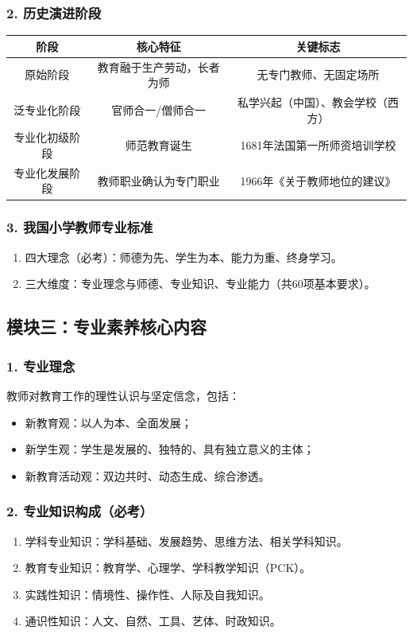 \documentclass[12pt,a4paper]{article}
\begin{document}
\subsubsection{2. 历史演进阶段}
\begin{longtable}{|c|c|c|}
\hline
\textbf{阶段} & \textbf{核心特征} & \textbf{关键标志} \\
\hline
原始阶段 & 教育融于生产劳动，长者为师 & 无专门教师、无固定场所 \\
\hline
泛专业化阶段 & 官师合一/僧师合一 & 私学兴起（中国）、教会学校（西方） \\
\hline
专业化初级阶段 & 师范教育诞生 & 1681年法国第一所师资培训学校 \\
\hline
专业化发展阶段 & 教师职业确认为专门职业 & 1966年《关于教师地位的建议》 \\
\hline
\end{longtable}

\subsubsection{3. 我国小学教师专业标准}
\begin{enumerate}[label=•,itemsep=0.5ex]
\item 四大理念（必考）：师德为先、学生为本、能力为重、终身学习。
\item 三大维度：专业理念与师德、专业知识、专业能力（共60项基本要求）。
\end{enumerate}

\subsection{模块三：专业素养核心内容}
\subsubsection{1. 专业理念}
教师对教育工作的理性认识与坚定信念，包括：
\begin{itemize}
    \item 新教育观：以人为本、全面发展；
    \item 新学生观：学生是发展的、独特的、具有独立意义的主体；
    \item 新教育活动观：双边共时、动态生成、综合渗透。
\end{itemize}

\subsubsection{2. 专业知识构成（必考）}
\begin{enumerate}[label=•,itemsep=0.5ex]
\item 学科专业知识：学科基础、发展趋势、思维方法、相关学科知识。
\item 教育专业知识：教育学、心理学、学科教学知识（PCK）。
\item 实践性知识：情境性、操作性、人际及自我知识。
\item 通识性知识：人文、自然、工具、艺体、时政知识。
\end{enumerate}
\end{document}
